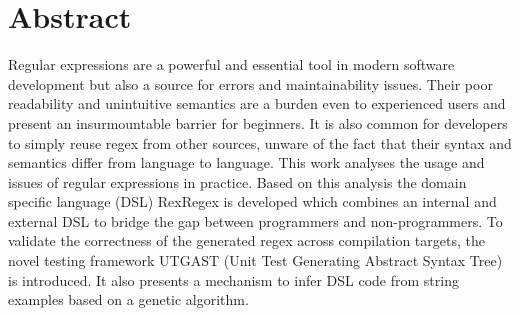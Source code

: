 \section*{Abstract}

Regular expressions are a powerful and essential tool in modern software development but also a source for errors and maintainability issues. Their poor readability and unintuitive semantics are a burden even to experienced users and present an insurmountable barrier for beginners. It is also common for developers to simply reuse regex from other sources, unware of the fact that their syntax and semantics differ from language to language. This work analyses the usage and issues of regular expressions in practice. Based on this analysis the domain specific language (DSL) RexRegex is developed which combines an internal and external DSL to bridge the gap between programmers and non-programmers. To validate the correctness of the generated regex across compilation targets, the novel testing framework UTGAST (Unit Test Generating Abstract Syntax Tree) is introduced. It also presents a mechanism to infer DSL code from string examples based on a genetic algorithm.
